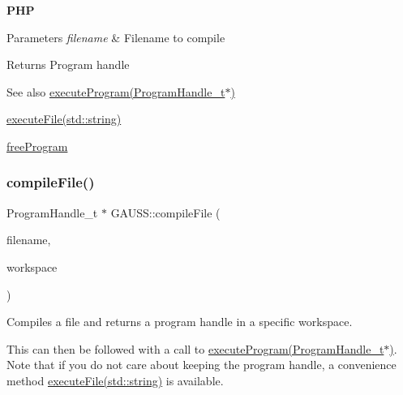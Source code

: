 {\bfseries P\+HP} 



\begin{DoxyParams}{Parameters}
{\em filename} & Filename to compile \\
\hline
\end{DoxyParams}
\begin{DoxyReturn}{Returns}
Program handle
\end{DoxyReturn}
\begin{DoxySeeAlso}{See also}
\hyperlink{class_g_a_u_s_s_a7fc9de69421c14aadb9a6310fecabcca}{execute\+Program(\+Program\+Handle\+\_\+t$\ast$)} 

\hyperlink{class_g_a_u_s_s_a949037ab9f5c49d94a0c7962dac0548d}{execute\+File(std\+::string)} 

\hyperlink{class_g_a_u_s_s_a64c8cf4b564aea63ed8e771c969b8936}{free\+Program} 
\end{DoxySeeAlso}
\mbox{\label{class_g_a_u_s_s_a85259cc52f5d47ebf79f33ab9e137ffa}} 
\subsubsection{\texorpdfstring{compile\+File()}{compileFile()}\hspace{0.1cm}{\footnotesize\ttfamily [2/2]}}
{\footnotesize\ttfamily Program\+Handle\+\_\+t $\ast$ G\+A\+U\+S\+S\+::compile\+File (\begin{DoxyParamCaption}\item[{std\+::string}]{filename,  }\item[{\hyperlink{class_g_e_workspace}{G\+E\+Workspace} $\ast$}]{workspace }\end{DoxyParamCaption})}



Compiles a file and returns a program handle in a specific workspace. 

This can then be followed with a call to \hyperlink{class_g_a_u_s_s_a7fc9de69421c14aadb9a6310fecabcca}{execute\+Program(\+Program\+Handle\+\_\+t$\ast$)}. Note that if you do not care about keeping the program handle, a convenience method \hyperlink{class_g_a_u_s_s_a949037ab9f5c49d94a0c7962dac0548d}{execute\+File(std\+::string)} is available.

